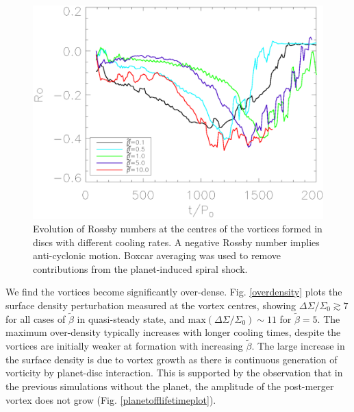 \begin{figure}
  \includegraphics[width=\linewidth,clip=true,trim=0.5cm
  0cm 0cm 1cm]{figures/rossby}
  \caption{Evolution of Rossby numbers at the centres of the vortices
    formed in discs with different cooling rates. A negative Rossby
    number implies anti-cyclonic motion. Boxcar averaging
    was used to remove contributions from the planet-induced spiral shock.\label{rossbyplot}}    
\end{figure}

We find the vortices become significantly 
over-dense. Fig. \ref{overdensity} plots the surface density perturbation measured at the
vortex centres, showing $\Delta\Sigma/\Sigma_0 \gtrsim 7$ for all
cases of $\tilde\beta$ in quasi-steady state, and 
$\mathrm{max}(\Delta\Sigma/\Sigma_0)\sim 11$ for $\tilde\beta=5$.  
The maximum over-density typically increases with longer cooling
times, despite the vortices are initially weaker at formation with
increasing $\tilde{\beta}$. The large increase in the surface density
is due to vortex growth as there is continuous generation of vorticity by
planet-disc interaction. This is supported by the observation that in
the previous simulations without the planet, the amplitude of
the post-merger vortex does not grow (Fig. 
\ref{planetofflifetimeplot}).  


